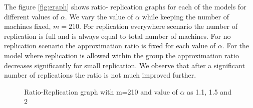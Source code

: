 \documentclass[10pt, conference, compsocconf]{IEEEtran}
\begin{document}
The figure \ref{fig:graph} shows ratio- replication graphs for each of the models for different values of $ \alpha$.  We vary the value of $\alpha$ while keeping the number of machines fixed, $m=210$. For replication everywhere scenario the number of replication is full and is always equal to total number of machines.  For no replication scenario the approximation ratio is fixed for each value of $\alpha$.  For the model where replication is allowed within the group the approximation ratio decreases significantly for small replication. We observe that after a significant number of replications the ratio is not much improved further. 


\begin {figure}
\begin{center}

\caption{Ratio-Replication graph with m=210 and value of $\alpha$ as 1.1, 1.5 and 2}
\label{fig:Graph}
\end{center}
\end {figure}










\end{document}
